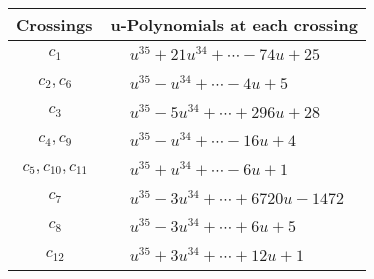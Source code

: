 \documentclass[1p]{elsarticle_modified}
\theoremstyle{definition}
\begin{document}
\begin{tabular}{m{50pt}|m{274pt}}
Crossings & \hspace{64pt}u-Polynomials at each crossing \\
\hline $$\begin{aligned}c_{1}\end{aligned}$$&$\begin{aligned}
&u^{35}+21 u^{34}+\cdots-74 u+25
\end{aligned}$\\
\hline $$\begin{aligned}c_{2},c_{6}\end{aligned}$$&$\begin{aligned}
&u^{35}- u^{34}+\cdots-4 u+5
\end{aligned}$\\
\hline $$\begin{aligned}c_{3}\end{aligned}$$&$\begin{aligned}
&u^{35}-5 u^{34}+\cdots+296 u+28
\end{aligned}$\\
\hline $$\begin{aligned}c_{4},c_{9}\end{aligned}$$&$\begin{aligned}
&u^{35}- u^{34}+\cdots-16 u+4
\end{aligned}$\\
\hline $$\begin{aligned}c_{5},c_{10},c_{11}\end{aligned}$$&$\begin{aligned}
&u^{35}+u^{34}+\cdots-6 u+1
\end{aligned}$\\
\hline $$\begin{aligned}c_{7}\end{aligned}$$&$\begin{aligned}
&u^{35}-3 u^{34}+\cdots+6720 u-1472
\end{aligned}$\\
\hline $$\begin{aligned}c_{8}\end{aligned}$$&$\begin{aligned}
&u^{35}-3 u^{34}+\cdots+6 u+5
\end{aligned}$\\
\hline $$\begin{aligned}c_{12}\end{aligned}$$&$\begin{aligned}
&u^{35}+3 u^{34}+\cdots+12 u+1
\end{aligned}$\\
\hline
\end{tabular}\\~\\
\end{document}

